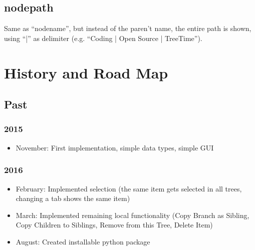 \documentclass[letterpaper,10pt,english]{sphinxmanual}
\begin{document}
\section{node\sphinxhyphen{}path}
\label{\detokenize{tree-fields:node-path}}
\sphinxAtStartPar
Same as “node\sphinxhyphen{}name”, but instead of the paren’t name, the entire path is shown, using “|” as delimiter (e.g. “Coding | Open Source | TreeTime”).

\sphinxstepscope


\chapter{History and Road Map}
\label{\detokenize{releases:history-and-road-map}}\label{\detokenize{releases::doc}}

\section{Past}
\label{\detokenize{releases:past}}

\subsection{2015}
\label{\detokenize{releases:id1}}\begin{itemize}
\item {} 
\sphinxAtStartPar
November: First implementation, simple data types, simple GUI

\end{itemize}


\subsection{2016}
\label{\detokenize{releases:id2}}\begin{itemize}
\item {} 
\sphinxAtStartPar
February: Implemented selection (the same item gets selected in all trees, changing a tab shows the same item)

\item {} 
\sphinxAtStartPar
March: Implemented remaining local functionality (Copy Branch as Sibling, Copy Children to Siblings, Remove from this Tree, Delete Item)

\item {} 
\sphinxAtStartPar
August: Created installable python package

\end{itemize}
\end{document}
